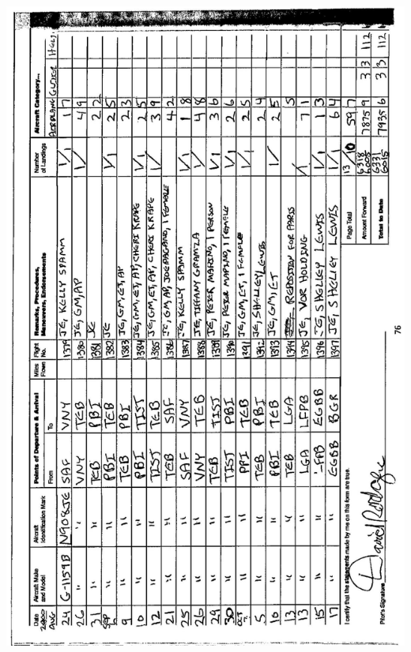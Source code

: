 \documentclass[10pt]{article}
\begin{document}
\includegraphics[max width=\textwidth, center]{2025_02_27_dd68c3d38de88f0516d9g-080}\\
\end{document}
